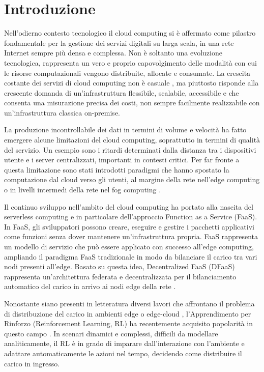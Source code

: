\chapter{Introduzione}

Nell'odierno contesto tecnologico il cloud computing si è affermato come pilastro fondamentale per la gestione dei servizi digitali su larga scala, in una rete Internet sempre più densa e complessa. Non è soltanto una evoluzione tecnologica, rappresenta un vero e proprio capovolgimento delle modalità con cui le risorse computazionali vengono distribuite, allocate e consumate. La crescita costante dei servizi di cloud computing non è casuale \cite{Ghatke2023}, ma piuttosto risponde alla crescente domanda di un'infrastruttura flessibile, scalabile, accessibile e che consenta una misurazione precisa dei costi, non sempre facilmente realizzabile con un'infrastruttura classica on-premise.

La produzione incontrollabile dei dati in termini di volume e velocità ha fatto emergere alcune limitazioni del cloud computing, soprattutto in termini di qualità del servizio. Un esempio sono i ritardi determinati dalla distanza tra i dispositivi utente e i server centralizzati, importanti in contesti critici. Per far fronte a questa limitazione sono stati introdotti paradigmi che hanno spostato la computazione dal cloud verso gli utenti, al margine della rete nell'edge computing o in livelli intermedi della rete nel fog computing \cite{Shash2021}.

Il continuo sviluppo nell'ambito del cloud computing ha portato alla nascita del serverless computing e in particolare dell'approccio Function as a Service (FaaS). In FaaS, gli sviluppatori possono creare, eseguire e gestire i pacchetti applicativi come funzioni senza dover mantenere un'infrastruttura propria. FaaS rappresenta un modello di servizio che può essere applicato con successo all'edge computing, ampliando il paradigma FaaS tradizionale in modo da bilanciare il carico tra vari nodi presenti all'edge. Basato su questa idea, Decentralized FaaS (DFaaS) rappresenta un'architettura federata e decentralizzata per il bilanciamento automatico del carico in arrivo ai nodi edge della rete \cite{Ciavotta2021}.

Nonostante siano presenti in letteratura diversi lavori che affrontano il problema di distribuzione del carico in ambienti edge o edge-cloud \cite{Hsieh2023}, l'Apprendimento per Rinforzo (Reinforcement Learning, RL) ha recentemente acquisito popolarità in questo campo \cite{Hortelano2023}. In scenari dinamici e complessi, difficili da modellare analiticamente, il RL è in grado di imparare dall'interazione con l'ambiente e adattare automaticamente le azioni nel tempo, decidendo come distribuire il carico in ingresso.


